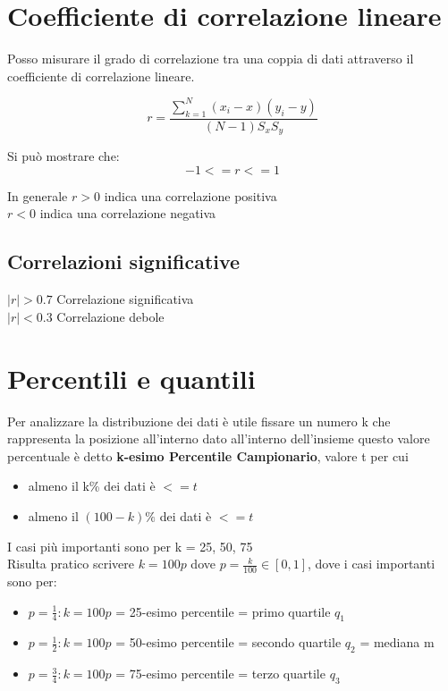 
\section{Coefficiente di correlazione lineare}
Posso misurare il grado di correlazione tra una coppia di dati attraverso il coefficiente di correlazione lineare. 

\begin{equation}
    r = \frac{\sum_{k=1}^N (x_i - x)(y_i - y)}{(N -1)S_x S_y}
\end{equation}

Si può mostrare che:
\begin{equation}
    -1<=r<=1
\end{equation}

In generale $r > 0$ indica una correlazione positiva
\\ $r < 0$ indica una correlazione negativa 

\subsection{Correlazioni significative}
$|r| > 0.7$ Correlazione significativa
\\$|r| < 0.3$ Correlazione debole

\section{Percentili e quantili}
Per analizzare la distribuzione dei dati è utile fissare un numero k che rappresenta la posizione all'interno dato all'interno dell'insieme
questo valore percentuale è detto \textbf{k-esimo Percentile Campionario}, valore t per cui
\begin{itemize}
    \item almeno il k\% dei dati è $ <= t$
    \item almeno il $(100 -k)\%$ dei dati è $<= t$
\end{itemize}

I casi più importanti sono per k = 25, 50, 75
\\ Risulta pratico scrivere $k = 100p$ dove $p = \frac{k}{100}\in [0, 1]$, dove i casi importanti sono per:
\begin{itemize} 
    \item $p = \frac{1}{4}: k = 100p$ = 25-esimo percentile = primo quartile $q_1$
    \item $p = \frac{1}{2}: k = 100p$ = 50-esimo percentile = secondo quartile $q_2$ = mediana m
    \item $p = \frac{3}{4}: k = 100p$ = 75-esimo percentile = terzo quartile $q_3$
\end{itemize}

